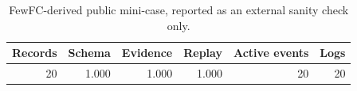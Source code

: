 \begin{table}[t]
\caption{FewFC-derived public mini-case, reported as an external sanity check only.}
\label{tab:public-mini-case}
\begin{tabular*}{\hsize}{@{\extracolsep{\fill}}rrrrrr@{}}
\toprule
Records & Schema & Evidence & Replay & Active events & Logs\\
\midrule
20 & 1.000 & 1.000 & 1.000 & 20 & 20\\
\bottomrule
\end{tabular*}
\end{table}
